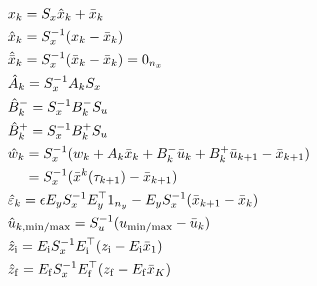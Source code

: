\documentclass[11pt,a4paper]{article}
\begin{document}
\begin{minipage}[t]{0.48\linewidth}
    \begin{align*}
        & x_k = S_x \hat{x}_k + \bar{x}_k\\
        & \hat{x}_k = S_x^{-1}(x_k-\bar{x}_k)\\
        & \hat{\bar{x}}_k = S_x^{-1}(\bar{x}_k-\bar{x}_k) = 0_{n_x}\\
        & \hat{A}_k = S_x^{-1}A_kS_x\\
        & \hat{B}^-_k = S_x^{-1}B^-_kS_u\\
        & \hat{B}^+_k = S_x^{-1}B^+_kS_u\\
        & \hat{w}_k = S_x^{-1}(w_k+A_k\bar{x}_k+B_k^{-}\bar{u}_k + B_k^{+}\bar{u}_{k+1} - \bar{x}_{k+1})\\
        &\phantom{\hat{w}_k} =S_x^{-1}(\bar{x}^{k}(\tau_{k+1})-\bar{x}_{k+1})\\
        & \hat{\varepsilon}_k = \epsilon E_yS_x^{-1}E_y^\top 1_{n_y} - E_yS_x^{-1}(\bar{x}_{k+1}-\bar{x}_k)\\
        & \hat{u}_{k,\min\!/\!\max} = S_u^{-1}(u_{\min\!/\!\max}-\bar{u}_k)\\
        & \hat{z}_{\mr{i}} = E_{\mr{i}}S_x^{-1}E_{\mr{i}}^\top(z_{\mr{i}} - E_{\mr{i}}\bar{x}_1)\\
        & \hat{z}_{\mr{f}} = E_{\mr{f}}S_x^{-1}E_{\mr{f}}^\top(z_{\mr{f}} - E_{\mr{f}}\bar{x}_K)
    \end{align*}
\end{minipage}
%
\end{document}
